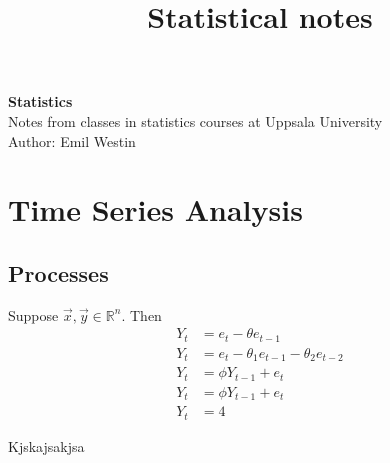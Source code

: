 \documentclass[11pt]{article}
\begin{document}
\title{Statistical notes}

\thispagestyle{empty}

\begin{center}
{\LARGE \bf Statistics}\\
Notes from classes in statistics courses at Uppsala University \\
Author: Emil Westin
\end{center}

\section{Time Series Analysis}
\subsection{Processes}

Suppose $\vec{x},\vec{y} \in \mathbb{R}^n$. Then 
\begin{align}
Y_t & = e_t - \theta e_{t-1} \label{MA1} \\
Y_t & = e_t - \theta_1 e_{t-1} -  \theta_2 e_{t-2} \label{MA2} \\
Y_t & = \phi Y_{t-1} + e_t \label{AR1} \\
Y_t & = \phi Y_{t-1} + e_t \label{AR2} \\
Y_t & = 4 \label{ARMA} 
\end{align}

Kjskajsakjsa
\end{document}
